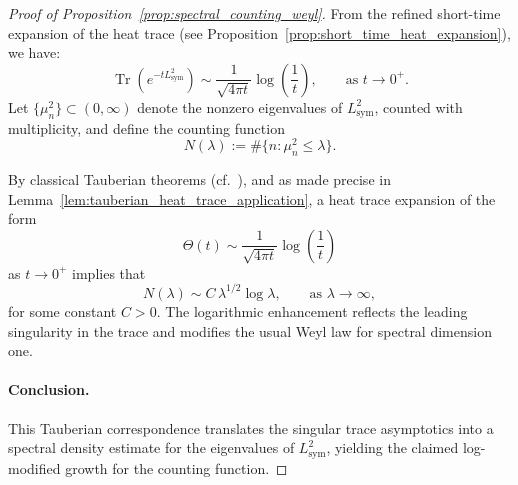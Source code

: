 \begin{proof}[Proof of Proposition~\ref{prop:spectral_counting_weyl}]
From the refined short-time expansion of the heat trace (see Proposition~\ref{prop:short_time_heat_expansion}), we have:
\[
\operatorname{Tr}(e^{-t L_{\mathrm{sym}}^2}) \sim \frac{1}{\sqrt{4\pi t}} \log\left( \frac{1}{t} \right), \qquad \text{as } t \to 0^+.
\]
Let \( \{ \mu_n^2 \} \subset (0, \infty) \) denote the nonzero eigenvalues of \( L_{\mathrm{sym}}^2 \), counted with multiplicity, and define the counting function
\[
N(\lambda) := \#\{ n : \mu_n^2 \leq \lambda \}.
\]

By classical Tauberian theorems (cf.~\cite[Thm.~4.12.9]{Korevaar2004Tauberian}), and as made precise in Lemma~\ref{lem:tauberian_heat_trace_application}, a heat trace expansion of the form
\[
\Theta(t) \sim \frac{1}{\sqrt{4\pi t}} \log\left( \frac{1}{t} \right)
\]
as \( t \to 0^+ \) implies that
\[
N(\lambda) \sim C \, \lambda^{1/2} \log \lambda, \qquad \text{as } \lambda \to \infty,
\]
for some constant \( C > 0 \). The logarithmic enhancement reflects the leading singularity in the trace and modifies the usual Weyl law for spectral dimension one.

\paragraph{Conclusion.}
This Tauberian correspondence translates the singular trace asymptotics into a spectral density estimate for the eigenvalues of \( L_{\mathrm{sym}}^2 \), yielding the claimed log-modified growth for the counting function.
\end{proof}
